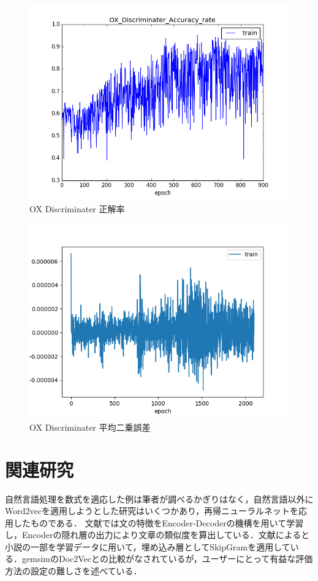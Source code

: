\documentclass[a4j,11pt,report]{jsbook}
\begin{document}
\begin{center}
  \begin{figure}
    \centering
    \includegraphics[width=0.8\linewidth]{image/OX_Discriminater_Accuracy_rateplot.png}
    \caption{OX Discriminater 正解率}
    \label{fig:OX_Discriminater_ACC}
  \end{figure}
\end{center}


\begin{center}
  \begin{figure}
    \centering
    \includegraphics[width=0.8\linewidth]{image/LOSSplot.png}
    \caption{OX Discriminater 平均二乗誤差 }
    \label{fig:OX_Discriminater_loss}
  \end{figure}
\end{center}
\clearpage








\chapter{関連研究\label{ch:relsatedwork}}
自然言語処理を数式を適応した例は筆者が調べるかぎりはなく，自然言語以外にWord2vecを適用しようとした研究はいくつかあり，再帰ニューラルネットを応用したものである．
文献\cite{kannrenn3}では文の特徴をEncoder-Decoderの機構を用いて学習し，Encoderの隠れ層の出力により文章の類似度を算出している．文献\cite{kannrenn3}によると小説の一部を学習データに用いて，埋め込み層としてSkipGramを適用している．gemsimのDoc2Vecとの比較がなされているが，ユーザーにとって有益な評価方法の設定の難しさを述べている．
\end{document}

